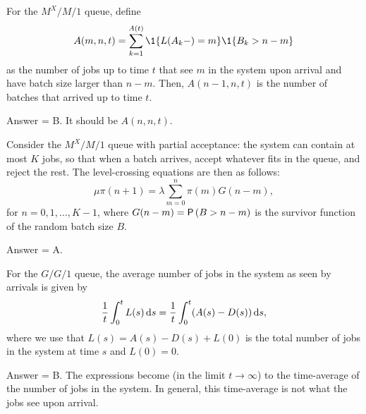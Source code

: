 \begin{exercise}[201803]
For the $M^X/M/1$ queue, define 
\begin{equation*}
 A(m,n,t) = \sum_{k=1}^{A(t)}\1{L(A_k-) = m}\1{B_k > n-m}
\end{equation*}
as the number of jobs up to time $t$ that see $m$ in the system upon
arrival and have batch size larger than $n-m$. Then, $A(n-1, n, t)$ is the number of batches that arrived up to time $t$. 
\begin{solution}
Answer = B. It should be $A(n, n,t)$.
\end{solution}
\end{exercise}

\begin{exercise}[201803]
Consider the $M^X/M/1$ queue with partial acceptance: the system can contain at most $K$ jobs, so that when a batch arrives, accept whatever fits in the queue, and reject the rest.
The level-crossing equations are then as follows:
 \begin{equation*}
 \mu \pi(n+1) = \lambda \sum_{m=0}^n \pi(m) G(n-m), 
 \end{equation*}
 for $n=0,1,\ldots, K-1$, where $G(n-m)=\P{B>n-m}$ is the survivor function of the random batch size $B$.
\begin{solution}
Answer = A.

\end{solution}
\end{exercise}

\begin{exercise}[201804]
For the $G/G/1$ queue, the average number of
jobs in the system as seen by arrivals is given by
\begin{equation}\label{eq:11}
\frac 1 t\int_0^t L(s)\,\text{d}s = \frac 1 t\int_0^t (A(s)-D(s)) \,\text{d}s,
\end{equation}
where we use that $L(s)=A(s) - D(s) + L(0)$ is the total number of jobs in
the system at time $s$ and $L(0)=0$.
\begin{solution}
Answer = B. The expressions become (in the limit $t\to\infty$) to the time-average of the number of jobs in the system. In general, this time-average is not what the jobs see upon arrival.
\end{solution}
\end{exercise}


